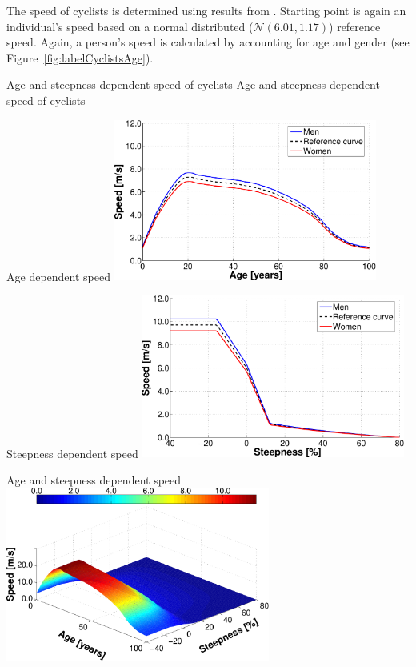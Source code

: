 The speed of cyclists is determined using results from \citet{ParkinRotheram_TPol_2010}. Starting point is again an individual's speed based on a normal distributed ($\mathcal{N}(6.01,1.17)$) reference speed. Again, a person's speed is calculated by accounting for age and gender (see Figure~\ref{fig:labelCyclistsAge}).

\createfigure%
{Age and steepness dependent speed of cyclists}%
{Age and steepness dependent speed of cyclists}%
{\label{fig:labelBikeTravelTimes}}%
{%
  \createsubfigure%
  {Age dependent speed}%
  {\includegraphics[width=0.65\textwidth, angle=0]{extending/figures/MultiModalSimulation/cyclistsAge}}%
  {\label{fig:labelCyclistsAge}}%
  {\vspace{5mm}}%

  \createsubfigure%
  {Steepness dependent speed}%
  {\includegraphics[width=0.65\textwidth, angle=0]{extending/figures/MultiModalSimulation/cyclistsSteepness}}%
  {\label{fig:labelCyclistsSteepness}}%
  {\vspace{4mm}}%

  \createsubfigure%
  {Age and steepness dependent speed}%
  {\includegraphics[width=0.65\textwidth, angle=0]{extending/figures/MultiModalSimulation/cyclists3d}}%
  {\label{fig:labelCyclistsAgeSteepness3d}}%
  {}%
}%
{}
\afterpage{\clearpage}	%

